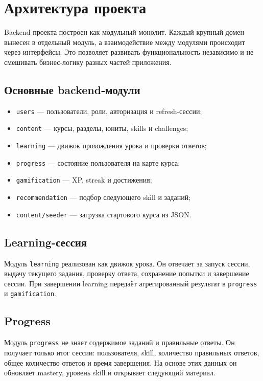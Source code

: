 \documentclass[12pt,a4paper]{article}
\begin{document}
\section{Архитектура проекта}

Backend проекта построен как модульный монолит. Каждый крупный домен вынесен в
отдельный модуль, а взаимодействие между модулями происходит через интерфейсы.
Это позволяет развивать функциональность независимо и не смешивать бизнес-логику
разных частей приложения.

\subsection*{Основные backend-модули}

\begin{itemize}
    \item \texttt{users} --- пользователи, роли, авторизация и refresh-сессии;
    \item \texttt{content} --- курсы, разделы, юниты, skills и challenges;
    \item \texttt{learning} --- движок прохождения урока и проверки ответов;
    \item \texttt{progress} --- состояние пользователя на карте курса;
    \item \texttt{gamification} --- XP, streak и достижения;
    \item \texttt{recommendation} --- подбор следующего skill и заданий;
    \item \texttt{content/seeder} --- загрузка стартового курса из JSON.
\end{itemize}

\subsection*{Learning-сессия}

Модуль \texttt{learning} реализован как движок урока. Он отвечает за запуск
сессии, выдачу текущего задания, проверку ответа, сохранение попытки и завершение
сессии. При завершении learning передаёт агрегированный результат в
\texttt{progress} и \texttt{gamification}.

\subsection*{Progress}

Модуль \texttt{progress} не знает содержимое заданий и правильные ответы. Он
получает только итог сессии: пользователя, skill, количество правильных ответов,
общее количество ответов и время завершения. На основе этих данных он обновляет
mastery, уровень skill и открывает следующий материал.
\end{document}
